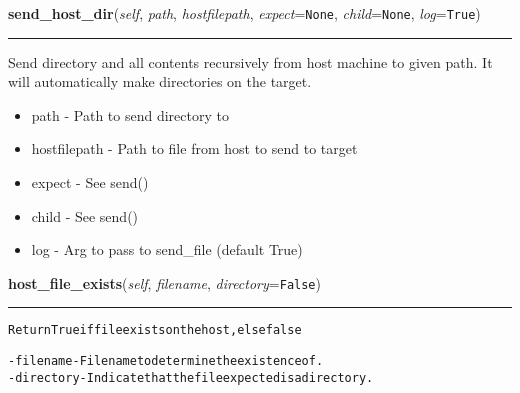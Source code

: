 \hspace{.8\funcindent}\begin{boxedminipage}{\funcwidth}

    \raggedright \textbf{send\_host\_dir}(\textit{self}, \textit{path}, \textit{hostfilepath}, \textit{expect}={\tt None}, \textit{child}={\tt None}, \textit{log}={\tt True})

    \vspace{-1.5ex}

    \rule{\textwidth}{0.5\fboxrule}
\setlength{\parskip}{2ex}
    Send directory and all contents recursively from host machine to given 
    path.  It will automatically make directories on the target.

    \begin{itemize}
    \setlength{\parskip}{0.6ex}
      \item path         - Path to send directory to

      \item hostfilepath - Path to file from host to send to target

      \item expect       - See send()

      \item child        - See send()

      \item log          - Arg to pass to send\_file (default True)

    \end{itemize}

\setlength{\parskip}{1ex}
    \end{boxedminipage}

    \label{shutit_global:ShutIt:host_file_exists}

    \vspace{0.5ex}

\hspace{.8\funcindent}\begin{boxedminipage}{\funcwidth}

    \raggedright \textbf{host\_file\_exists}(\textit{self}, \textit{filename}, \textit{directory}={\tt False})

    \vspace{-1.5ex}

    \rule{\textwidth}{0.5\fboxrule}
\setlength{\parskip}{2ex}
\begin{alltt}
Return True if file exists on the host, else false

- filename     - Filename to determine the existence of.
- directory    - Indicate that the file expected is a directory.
\end{alltt}

\setlength{\parskip}{1ex}
    \end{boxedminipage}

